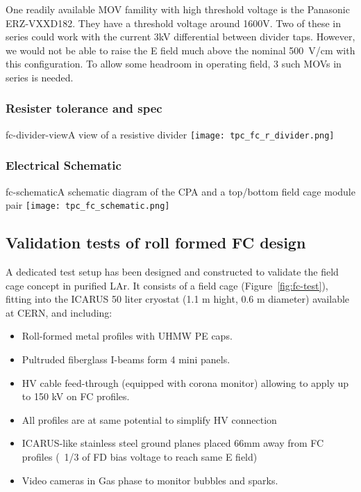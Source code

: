 One readily available MOV famility with high threshold voltage is the Panasonic ERZ-VXXD182.  They have a threshold voltage around 1600V.  Two of these in series could work with the current 3kV differential between divider taps.  However, we would not be able to raise the E field much above the nominal 500~V/cm with this configuration.  To allow some headroom in operating field, 3 such MOVs in series is needed.





\subsubsection{Resister tolerance and spec}

\begin{cdrfigure}{fc-divider-view}{A view of a resistive divider}
\texttt{[image: tpc\_fc\_r\_divider.png]}
\end{cdrfigure}

\subsubsection{Electrical Schematic}
 
\begin{cdrfigure}{fc-schematic}{A schematic diagram of the CPA and a top/bottom field cage module pair}
\texttt{[image: tpc\_fc\_schematic.png]}
\end{cdrfigure}

\subsection{Validation tests of roll formed FC design}

A dedicated test setup has been designed and constructed to validate the field cage concept  in purified LAr.
It consists of a field cage (Figure~\ref{fig:fc-test}), fitting into the ICARUS 50 liter cryostat (1.1 m hight, 0.6 m diameter) available at CERN, and  including:

\begin{itemize}	
\item Roll-formed metal profiles with UHMW PE caps.
\item Pultruded fiberglass I-beams form 4 mini panels.
\item HV cable feed-through (equipped with corona monitor) allowing to apply up to 150 kV on FC profiles.
\item All profiles are at same potential to simplify HV connection
\item ICARUS-like stainless steel ground planes placed  66mm away from FC profiles (~1/3 of FD bias voltage to reach
same E field)
\item Video cameras in Gas phase to monitor bubbles and sparks.
\end{itemize}

